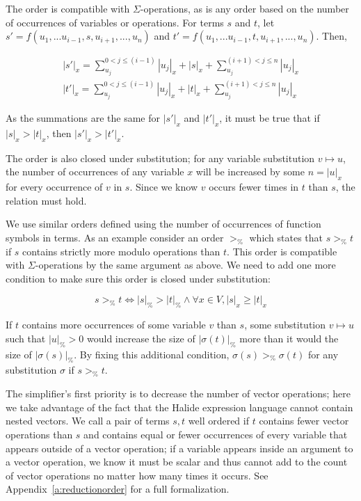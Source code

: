 \documentclass[sigplan,10pt,review,anonymous]{acmart}\settopmatter{printfolios=true,printccs=false,printacmref=false}
\begin{document}
The order is compatible with $\Sigma$-operations, as is any order based on the number of occurrences of variables or operations. For terms $s$ and $t$, let $s' = f(u_1,...u_{i-1},s,u_{i+1},...,u_n)$ and $t' = f(u_1,...u_{i-1},t,u_{i+1},...,u_n)$. Then, 

\begin{gather*}
|s'|_x = \sum_{u_j}^{0<j \leq (i-1)} |u_j|_x + |s|_x + \sum_{u_j}^{(i+1)<j \leq n} |u_j|_x \\
|t'|_x = \sum_{u_j}^{0<j \leq (i-1)} |u_j|_x + |t|_x + \sum_{u_j}^{(i+1)<j \leq n} |u_j|_x
\end{gather*}

As the summations are the same for $|s'|_x$ and $|t'|_x$, it must be true that if $|s|_x > |t|_x$, then $|s'|_x > |t'|_x$.

The order is also closed under substitution; for any variable substitution
$v \mapsto u$, the number of occurrences of any variable $x$ will be increased
by some $n = |u|_x$ for every occurrence of $v$ in $s$. Since we know $v$ occurs
fewer times in $t$ than $s$, the relation must hold.

We use similar orders defined using the number of occurrences of function symbols in terms. As an example consider an order $>_{\texttt{\%}}$ which states that $s >_{\texttt{\%}} t$ if $s$ contains strictly more modulo operations than $t$. This order is compatible with $\Sigma$-operations by the same argument as above. We need to add one more condition to make sure this order is closed under substitution:

\begin{equation*}
s >_{\texttt{\%}} t \iff |s|_{\texttt{\%}} > |t|_{\texttt{\%}} \wedge \forall x \in V, |s|_x \geq |t|_x
\end{equation*}

If $t$ contains more occurrences of some variable $v$ than $s$, some substitution $v \mapsto u$ such that $|u|_{\texttt{\%}} > 0$ would increase the size of $|\sigma(t)|_{\texttt{\%}}$ more than it would the size of $|\sigma(s)|_{\texttt{\%}}$. By fixing this additional condition, $\sigma(s) >_{\texttt{\%}} \sigma(t)$ for any substitution $\sigma$ if $s >_{\texttt{\%}} t$.

The simplifier's first priority is to decrease the number of vector operations; here we take advantage of the fact that the Halide expression language cannot contain nested vectors. We call a pair of terms $s, t$ well ordered if $t$ contains fewer vector operations than $s$ and contains equal or fewer occurrences of every variable that appears outside of a vector operation; if a variable appears inside an argument to a vector operation, we know it must be scalar and thus cannot add to the count of vector operations no matter how many times it occurs. See Appendix~\ref{a:reductionorder} for a full formalization.
\end{document}
